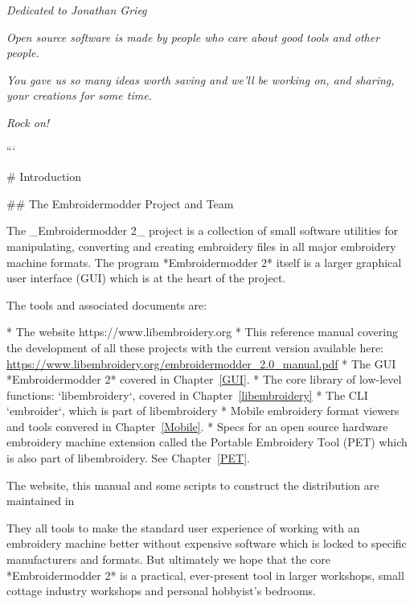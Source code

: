 \newpage

\vspace*{8cm}

\begin{center}
    \emph{Dedicated to Jonathan Grieg}
    
    \vspace{1cm}
    
    \emph{Open source software is made by people who care about good tools
     and other people.}
    
    \vspace{1cm}
    
    \emph{You gave us so many ideas worth saving and we'll be working on,
    and sharing, your creations for some time.}
    
    \vspace{1cm}
    
    \emph{Rock on!}
\end{center}
    
\newpage

\tableofcontents
```

# Introduction

## The Embroidermodder Project and Team

The _Embroidermodder 2_ project is a collection of small software
utilities for manipulating, converting and creating embroidery files in all
major embroidery machine formats. The program *Embroidermodder 2* itself
is a larger graphical user interface (GUI) which is at the heart of the project.

The tools and associated documents are:

* The website https://www.libembroidery.org
* This reference manual covering the development of all these projects with the current version available here: \url{https://www.libembroidery.org/embroidermodder_2.0_manual.pdf}
* The GUI *Embroidermodder 2* covered in Chapter~\ref{GUI}.
* The core library of low-level functions: `libembroidery`, covered in Chapter~\ref{libembroidery}
* The CLI `embroider`, which is part of libembroidery
* Mobile embroidery format viewers and tools convered in Chapter~\ref{Mobile}.
* Specs for an open source hardware embroidery machine extension called the Portable Embroidery Tool (PET) which is also part of libembroidery. See Chapter~\ref{PET}.

The website, this manual and some scripts to construct the distribution are
maintained in %

They all tools to make the standard
user experience of working with an embroidery machine better without expensive
software which is locked to specific manufacturers and formats. But ultimately
we hope that the core *Embroidermodder 2* is a practical, ever-present tool in
larger workshops, small cottage industry workshops and personal hobbyist's
bedrooms.

